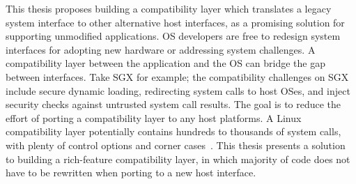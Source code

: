 This thesis proposes building a compatibility layer
which translates
a legacy system interface to other alternative host interfaces, as a promising solution for supporting unmodified applications.
OS developers are free to redesign
system interfaces
for adopting new hardware or addressing system challenges.
A compatibility layer between the application and the OS
can bridge the gap between interfaces.
Take SGX for example;
the compatibility challenges on SGX include
secure dynamic loading,
redirecting system calls to host OSes, and inject security checks against untrusted system call results.
The goal is to reduce the effort of porting a compatibility layer
to any host platforms.
A Linux compatibility layer
potentially contains
hundreds to thousands of system calls, with plenty of control options and corner cases~\cite{linux-man-syscall}.
This thesis presents a solution
to building a rich-feature compatibility layer, in which
majority of code does not have to be rewritten when porting to a new host interface.









